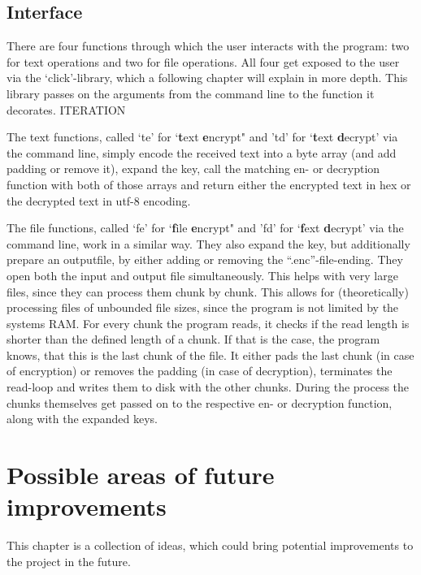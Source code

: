 \hypertarget{interface}{%
\subsection{Interface}\label{interface}}

There are four functions through which the user interacts with the
program: two for text operations and two for file operations. All four
get exposed to the user via the `click'-library, which a following
chapter will explain in more depth. This library passes on the arguments
from the command line to the function it decorates. ITERATION

The text functions, called `te' for `\textbf{t}ext \textbf{e}ncrypt" and
'td' for `\textbf{t}ext \textbf{d}ecrypt' via the command line, simply
encode the received text into a byte array (and add padding or remove
it), expand the key, call the matching en- or decryption function with
both of those arrays and return either the encrypted text in hex or the
decrypted text in utf-8 encoding.

The file functions, called `fe' for `\textbf{f}ile \textbf{e}ncrypt" and
'fd' for `\textbf{f}ext \textbf{d}ecrypt' via the command line, work in
a similar way. They also expand the key, but additionally prepare an
outputfile, by either adding or removing the ``.enc''-file-ending. They
open both the input and output file simultaneously. This helps with very
large files, since they can process them chunk by chunk. This allows for
(theoretically) processing files of unbounded file sizes, since the
program is not limited by the systems RAM. For every chunk the program
reads, it checks if the read length is shorter than the defined length
of a chunk. If that is the case, the program knows, that this is the
last chunk of the file. It either pads the last chunk (in case of
encryption) or removes the padding (in case of decryption), terminates
the read-loop and writes them to disk with the other chunks. During the
process the chunks themselves get passed on to the respective en- or
decryption function, along with the expanded keys.

\hypertarget{possible-areas-of-future-improvements}{%
\section{Possible areas of future
improvements}\label{possible-areas-of-future-improvements}}

This chapter is a collection of ideas, which could bring potential
improvements to the project in the future.

